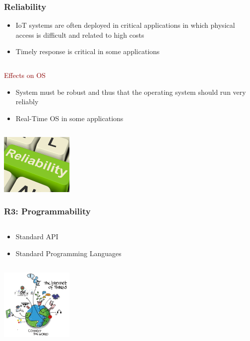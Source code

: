 \documentclass{beamer}
\begin{document}
\begin{frame}
	\frametitle{Reliability}

	\begin{itemize}
		\justifying
		\item IoT systems are often deployed in critical applications in which physical access is difficult and related to high costs
		\item Timely response is critical in some applications 
	\end{itemize}

	\begin{columns}
	\begin{block}{\centering\textcolor{darkred}{Effects on OS}}
		\justifying
		\begin{itemize}
			\item System must be robust and thus that the operating system should run very reliably
			\item Real-Time OS in some applications
		\end{itemize}
	\end{block}
	\end{columns}
	\vspace{0.5cm}
		
	\hspace*{7cm} \includegraphics[width=3.5cm]{figs/reliability.jpg}
\end{frame}

\begin{frame}
	\frametitle{R3: Programmability}
	\begin{columns}[c]
		\begin{column}{30cm}
			\vspace{.1cm}
			\begin{itemize}
				\justifying
				\item Standard API
				\item Standard Programming Languages
			\end{itemize}
		\end{column}
	\end{columns}
	\hspace*{7cm} \includegraphics[width=3.5cm]{figs/Internet-of-Things-3.jpg}
\end{frame}
\end{document}
